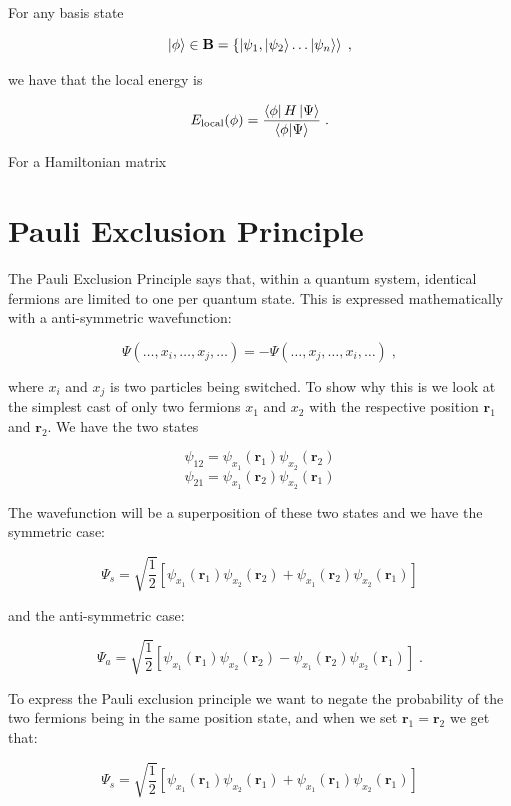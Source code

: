 For any basis state

$$\ket{\phi} \in \mathbf{B} = \{ \ket{\psi_1, \ket{\psi_2} \dots \ket{\psi_n}} \; ,$$

we have that the local energy is 

\begin{equation}
    E_{\text{local}}(\phi) = \frac{\bra{\phi}H\ket{\Psi}}{\braket{\phi}{\Psi}} \; .
\end{equation}

For a Hamiltonian matrix 

\section{Pauli Exclusion Principle}

The Pauli Exclusion Principle says that, within a quantum system, identical fermions are limited to one per quantum state. This is expressed mathematically with a anti-symmetric wavefunction:

\begin{equation}
    \Psi(\dots,x_i,\dots,x_j,\dots) =-\Psi(\dots,x_j,\dots,x_i,\dots) \; ,
\end{equation}

where $x_i$ and $x_j$ is two particles being switched. To show why this is we look at the simplest cast of only two fermions $x_1$ and $x_2$ with the respective position $\mathbf{r}_1$ and $\mathbf{r}_2$. We have the two states

$$\psi_{12} = \psi_{x_1}(\mathbf{r}_1)\psi_{x_2}(\mathbf{r}_2)$$
$$\psi_{21} = \psi_{x_1}(\mathbf{r}_2)\psi_{x_2}(\mathbf{r}_1)$$

The wavefunction will be a superposition of these two states and we have the symmetric case:

$$\Psi_s = \sqrt{\frac{1}{2}} \left [ \psi_{x_1}(\mathbf{r}_1)\psi_{x_2}(\mathbf{r}_2) + \psi_{x_1}(\mathbf{r}_2)\psi_{x_2}(\mathbf{r}_1) \right ]$$

and the anti-symmetric case:

$$\Psi_a = \sqrt{\frac{1}{2}} \left [ \psi_{x_1}(\mathbf{r}_1)\psi_{x_2}(\mathbf{r}_2) - \psi_{x_1}(\mathbf{r}_2)\psi_{x_2}(\mathbf{r}_1)\right ] \; .$$

To express the Pauli exclusion principle we want to negate the probability of the two fermions being in the same position state, and when we set $\mathbf{r}_1 = \mathbf{r}_2$ we get that:

$$\Psi_s = \sqrt{\frac{1}{2}} \left [ \psi_{x_1}(\mathbf{r}_1)\psi_{x_2}(\mathbf{r}_1) + \psi_{x_1}(\mathbf{r}_1)\psi_{x_2}(\mathbf{r}_1)\right]$$

